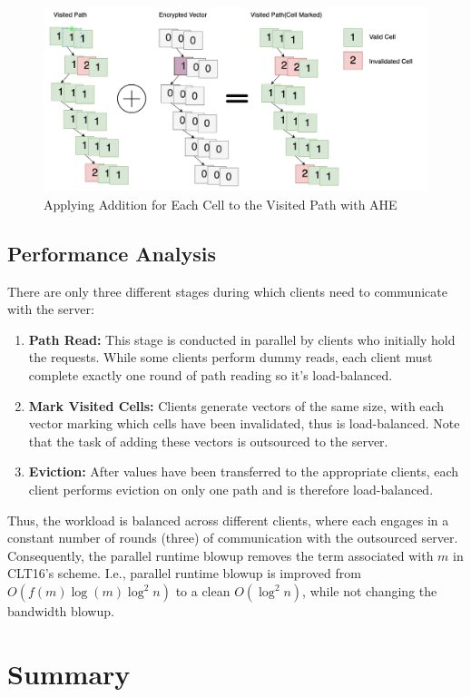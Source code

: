 \documentclass[fontsize=11pt]{article}
\begin{document}
\begin{figure}
    \centering
    \includegraphics[width=1\linewidth]{pics/AHE.png}
    \caption{Applying Addition for Each Cell to the Visited Path with AHE}
    \label{fig:vector-addition}
\end{figure}
\subsection{Performance Analysis}
There are only three different stages during which clients need to communicate with the server:
\begin{enumerate}
\item \textbf{Path Read:} This stage is conducted in parallel by clients who initially hold the requests. While some clients perform dummy reads, each client must complete exactly one round of path reading so it's load-balanced.
\item \textbf{Mark Visited Cells:} Clients generate vectors of the same size, with each vector marking which cells have been invalidated, thus is load-balanced. Note that the task of adding these vectors is outsourced to the server.
\item \textbf{Eviction:} After values have been transferred to the appropriate clients, each client performs eviction on only one path and is therefore load-balanced.
\end{enumerate}
Thus, the workload is balanced across different clients, where each engages in a constant number of rounds (three) of communication with the outsourced server. Consequently, the parallel runtime blowup removes the term associated with $m$ in CLT16’s scheme. I.e., parallel runtime blowup is improved from $O(f(m)\log(m)\log^2 n)$ to a clean $O(\log^2 n)$, while not changing the bandwidth blowup.


\section{Summary}
\end{document}
